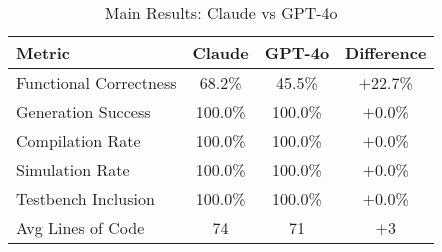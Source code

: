 \begin{table}[h]
\centering
\caption{Main Results: Claude vs GPT-4o}
\begin{tabular}{l|c|c|c}
\hline
\textbf{Metric} & \textbf{Claude} & \textbf{GPT-4o} & \textbf{Difference} \\
\hline
Functional Correctness & 68.2\% & 45.5\% & $+$22.7\% \\
Generation Success & 100.0\% & 100.0\% & $+$0.0\% \\
Compilation Rate & 100.0\% & 100.0\% & $+$0.0\% \\
Simulation Rate & 100.0\% & 100.0\% & $+$0.0\% \\
Testbench Inclusion & 100.0\% & 100.0\% & $+$0.0\% \\
Avg Lines of Code & 74 & 71 & $+$3 \\
\hline
\end{tabular}
\end{table}
